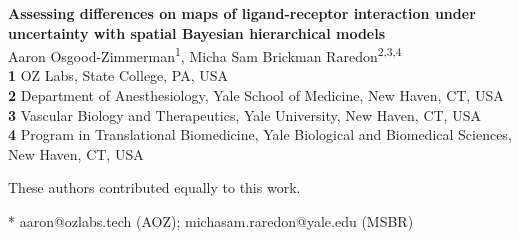 \documentclass[10pt,letterpaper]{article}
\begin{document}
\vspace*{0.2in}

\begin{flushleft}
{\Large
\textbf{Assessing differences on maps of ligand-receptor interaction under uncertainty with spatial Bayesian hierarchical models}
}
\newline
\\
Aaron Osgood-Zimmerman\textsuperscript{1\Yinyang*},
Micha Sam Brickman Raredon\textsuperscript{2,3,4\Yinyang*}
\\
\bigskip
\textbf{1} OZ Labs, State College, PA, USA
\\
\textbf{2} Department of Anesthesiology, Yale School of Medicine, New Haven, CT, USA
\\
\textbf{3} Vascular Biology and Therapeutics, Yale University, New Haven, CT, USA
\\
\textbf{4} Program in Translational Biomedicine, Yale Biological and Biomedical Sciences, New Haven, CT, USA
\\
\bigskip

\Yinyang These authors contributed equally to this work.

* aaron@ozlabs.tech (AOZ); michasam.raredon@yale.edu (MSBR)

\end{flushleft}
\end{document}
